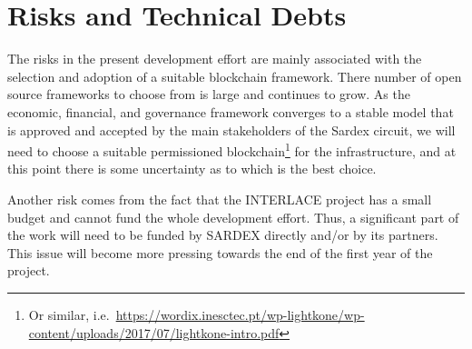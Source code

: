 







\section{Risks and Technical Debts}\label{section-technical-risks}
The risks in the present development effort are mainly associated with the selection and adoption of a suitable blockchain framework. There number of open source frameworks to choose from is large and continues to grow. As the economic, financial, and governance framework converges to a stable model that is approved and accepted by the main stakeholders of the Sardex circuit, we will need to choose a suitable permissioned blockchain\footnote{Or similar, i.e.\ \url{https://wordix.inesctec.pt/wp-lightkone/wp-content/uploads/2017/07/lightkone-intro.pdf}} for the infrastructure, and at this point there is some uncertainty as to which is the best choice.

Another risk comes from the fact that the INTERLACE project has a small budget and cannot fund the whole development effort. Thus, a significant part of the work will need to be funded by SARDEX directly and/or by its partners. This issue will become more pressing towards the end of the first year of the project.

